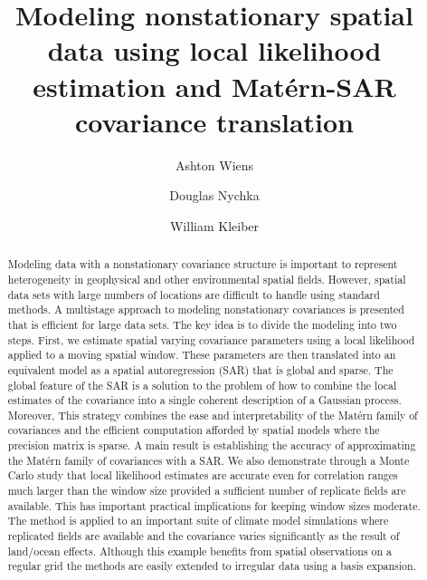 \documentclass[review]{elsarticle}
\begin{document}
\begin{frontmatter}

\title{Modeling nonstationary spatial data using local likelihood estimation and Mat\'ern-SAR covariance translation}
 
\author[CU]{Ashton Wiens}
\author[CSM]{Douglas Nychka}
\author[CU]{William Kleiber}
\address[CU]{Department of Applied Mathematics, University of Colorado, Boulder, Colorado, USA}
\address[CSM]{Department of Applied Mathematics and Statistics, Colorado School of Mines, Golden, Colorado, USA}

\address{Colorado, United States}

\begin{abstract}

Modeling data with a nonstationary covariance structure is important to represent heterogeneity in geophysical and other environmental spatial fields. However, spatial data sets with large numbers of locations are difficult to handle using standard methods.  A multistage approach to modeling nonstationary covariances is presented that is efficient for large data sets.  The key idea is to divide the modeling into two steps. First, we estimate spatial varying covariance parameters using a local likelihood applied to a moving spatial window. These parameters are then translated into an equivalent model as a spatial autoregression (SAR) that is global and sparse. The global feature of the SAR is a solution to the problem of how to combine the local estimates of the covariance into a single coherent description of a Gaussian process.  Moreover, This strategy combines the ease and interpretability of the Mat\'ern family of covariances and the efficient computation afforded by spatial models where the precision matrix is sparse. 
A main result is establishing the accuracy of approximating the Mat\'ern family of covariances with a SAR. We also demonstrate 
 through a Monte Carlo study that local likelihood estimates are accurate even for correlation ranges much larger than the window size provided a sufficient number of replicate fields are available.  This has important practical implications for keeping window sizes moderate. 
 The method is applied to an important suite of climate model simulations where replicated fields are available and the covariance varies significantly as the result of land/ocean effects.  Although this example benefits from spatial observations on a regular grid the methods are easily extended to irregular data using a basis expansion. 


\end{abstract}
\end{frontmatter}
\end{document}
